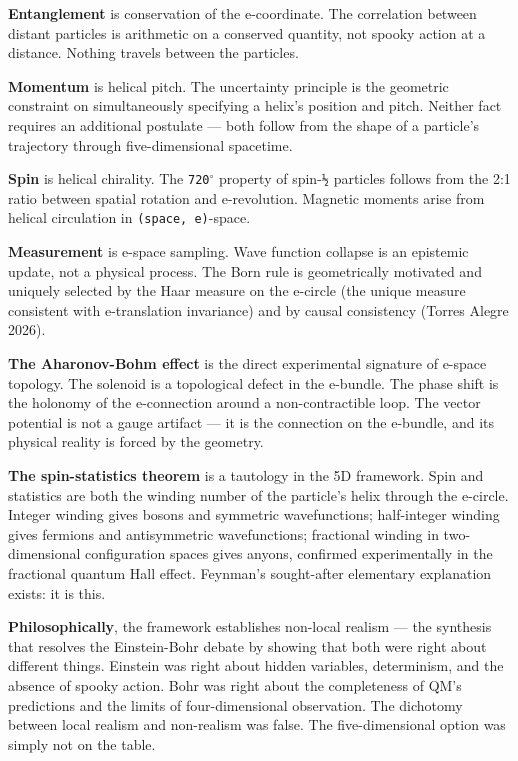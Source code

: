 \documentclass[aps,prd,preprint,superscriptaddress,longbibliography,floatfix]{revtex4-2}
\theoremstyle{remark}
\begin{document}
\textbf{Entanglement} is conservation of the e-coordinate. The correlation between distant particles is arithmetic on a conserved quantity, not spooky action at a distance. Nothing travels between the particles.

\textbf{Momentum} is helical pitch. The uncertainty principle is the geometric constraint on simultaneously specifying a helix's position and pitch. Neither fact requires an additional postulate --- both follow from the shape of a particle's trajectory through five-dimensional spacetime.

\textbf{Spin} is helical chirality. The \texttt{720$^{\circ}$} property of spin-\texttt{½} particles follows from the 2:1 ratio between spatial rotation and e-revolution. Magnetic moments arise from helical circulation in \texttt{(space, e)}-space.

\textbf{Measurement} is e-space sampling. Wave function collapse is an epistemic update, not a physical process. The Born rule is geometrically motivated and uniquely selected by the Haar measure on the e-circle (the unique measure consistent with e-translation invariance) and by causal consistency (Torres Alegre 2026).

\textbf{The Aharonov-Bohm effect} is the direct experimental signature of e-space topology. The solenoid is a topological defect in the e-bundle. The phase shift is the holonomy of the e-connection around a non-contractible loop. The vector potential is not a gauge artifact --- it is the connection on the e-bundle, and its physical reality is forced by the geometry.

\textbf{The spin-statistics theorem} is a tautology in the 5D framework. Spin and statistics are both the winding number of the particle's helix through the e-circle. Integer winding gives bosons and symmetric wavefunctions; half-integer winding gives fermions and antisymmetric wavefunctions; fractional winding in two-dimensional configuration spaces gives anyons, confirmed experimentally in the fractional quantum Hall effect. Feynman's sought-after elementary explanation exists: it is this.

\textbf{Philosophically}, the framework establishes non-local realism --- the synthesis that resolves the Einstein-Bohr debate by showing that both were right about different things. Einstein was right about hidden variables, determinism, and the absence of spooky action. Bohr was right about the completeness of QM's predictions and the limits of four-dimensional observation. The dichotomy between local realism and non-realism was false. The five-dimensional option was simply not on the table.
\end{document}
